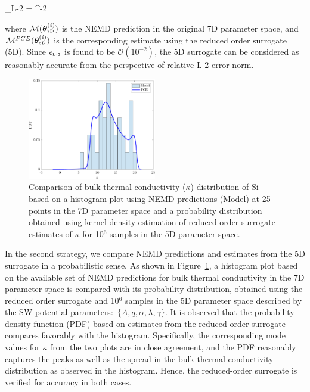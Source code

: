 \be
\epsilon_{\mbox{\tiny{L-2}}} = 
 ^{-2}
\ee
 
\noindent where $\mathcal{M}(\bm{\theta}_{\mbox{\tiny{7D}}}^{(i)})$ is the NEMD prediction in the original 7D
parameter space, and $\mathcal{M}^{PCE}(\bm{\theta}_{\mbox{\tiny{5D}}}^{(i)})$ is the corresponding 
estimate using the reduced order surrogate (5D). 
Since $\epsilon_{\mbox{\tiny{L-2}}}$ is found to be $\mathcal{O}(10^{-2})$, the 5D surrogate can be considered as
reasonably accurate from the perspective of relative L-2 error norm. 

\begin{figure}[htbp]
 \begin{center}
  \includegraphics[width=0.50\textwidth]{./Figures/PCE5D_kde}
\caption{Comparison of bulk thermal conductivity ($\kappa$) distribution of Si based on a histogram plot
using NEMD predictions (Model) at 25 points in the 7D parameter space and a probability distribution obtained 
using kernel density estimation of  reduced-order surrogate estimates of $\kappa$ for 10$^6$ samples in the 5D
parameter space.}
\label{fig:verify}
\end{center}
\end{figure}

In the second strategy, we compare NEMD
predictions and estimates from the 5D surrogate in a probabilistic sense. As shown in Figure~\ref{fig:verify}, a 
histogram plot based on the available set of NEMD predictions for bulk thermal conductivity in the 7D parameter 
space is compared with its probability distribution, obtained using the reduced order surrogate and
10$^6$ samples in the 5D parameter space described by the SW potential parameters:~$\{A,q,\alpha,\lambda,\gamma\}$. It is observed that the probability density function (PDF) based on estimates from the reduced-order surrogate compares
favorably with the histogram. Specifically, the corresponding mode values for $\kappa$ from the two plots are
in close agreement, and the PDF reasonably captures the peaks as well as the spread in
the bulk thermal conductivity distribution as observed in the histogram. 
Hence, the reduced-order surrogate is verified for accuracy in both cases. 
\bigskip

